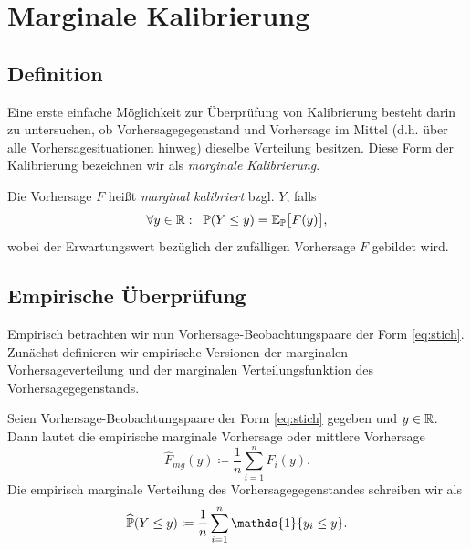 

\section{Marginale Kalibrierung}\label{sec:marg_cal}
\subsection{Definition}
Eine erste einfache Möglichkeit zur Überprüfung von Kalibrierung besteht darin zu untersuchen, ob Vorhersagegegenstand und Vorhersage im Mittel (d.h. über alle Vorhersagesituationen hinweg) dieselbe Verteilung besitzen. Diese Form der Kalibrierung bezeichnen wir als \emph{marginale Kalibrierung}.

\begin{defi}
Die Vorhersage $F$ heißt \emph{marginal kalibriert}  bzgl. $Y$, falls
\[
\forall y \in \mathbb{R}: \; \; \mathbb{P}(Y \leq y) = \mathbb{E}_{\mathbb{P}} \big[F(y)\big],
\]
wobei der Erwartungswert bezüglich der zufälligen Vorhersage $F$ gebildet wird.
\end{defi}{}



\subsection{Empirische Überprüfung}
Empirisch betrachten wir nun Vorhersage-Beobachtungspaare der Form \eqref{eq:stich}. Zunächst definieren wir empirische Versionen der marginalen Vorhersageverteilung und der marginalen Verteilungsfunktion des Vorhersagegegenstands.

\begin{defi}
Seien Vorhersage-Beobachtungspaare der Form \eqref{eq:stich} gegeben und $y \in \mathbb{R}$. Dann lautet die empirische marginale Vorhersage oder mittlere Vorhersage
\begin{equation} \label{eq:F_mg}
   \hat{F}_{mg}(y)\coloneqq\frac{1}{n}\sum_{i=1}^{n}F_i(y). 
\end{equation}
Die empirisch marginale Verteilung des Vorhersagegegenstandes schreiben wir als
\begin{equation} \label{eq:Y_mg}
\widehat{\PW}(Y \leq y)\coloneqq\frac{1}{n}\sum_{i=1}^{n}\mathds{1}\{y_i\leq y\}.
\end{equation}

\end{defi}

